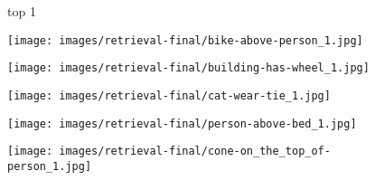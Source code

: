 \documentclass[10pt,twocolumn,letterpaper]{article}
\begin{document}
\begin{figure*}[t]
	\begin{minipage}[b]{0.005\textwidth}
    	\centering
    	\begin{turn}{90}
    	top 1
    	\end{turn}	
    \vspace{3.5ex}
    \end{minipage}
    \hspace{0.01\textwidth}
    \begin{minipage}[t]{0.18\textwidth}
    	\centering
       	\texttt{[image: images/retrieval-final/bike-above-person\_1.jpg]}\\
       	\vspace{0.2ex}
    \end{minipage}
    \hspace{0.005\textwidth}
    \begin{minipage}[t]{0.18\textwidth}
       \centering
       \texttt{[image: images/retrieval-final/building-has-wheel\_1.jpg]}\\
       \vspace{0.2ex}
    \end{minipage}
    \hspace{0.005\textwidth}
    \begin{minipage}[t]{0.18\textwidth}
    	\centering
       	\texttt{[image: images/retrieval-final/cat-wear-tie\_1.jpg]}\\
       	\vspace{0.2ex}
    \end{minipage}
    \hspace{0.005\textwidth}
    \begin{minipage}[t]{0.18\textwidth}
    	\centering
       	\texttt{[image: images/retrieval-final/person-above-bed\_1.jpg]}\\
       	\vspace{0.2ex}
    \end{minipage}
    \hspace{0.005\textwidth}  
    \begin{minipage}[t]{0.18\textwidth}
    	\centering
       	\texttt{[image: images/retrieval-final/cone-on\_the\_top\_of-person\_1.jpg]}\\
      	\vspace{0.2ex}
    \end{minipage} 
    

\end{figure*}
\end{document}
